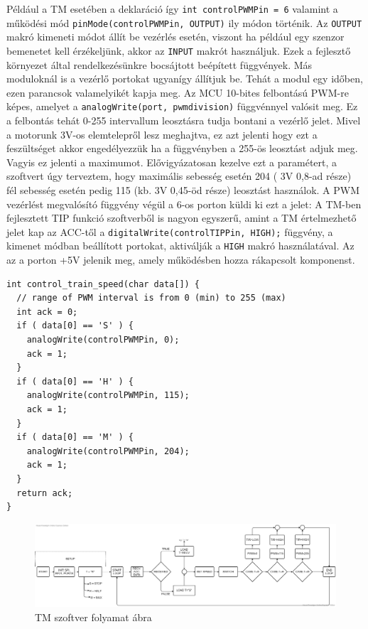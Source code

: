 \documentclass[a4paper,12pt]{article}
\begin{document}
Például a TM esetében a deklaráció így \texttt{int controlPWMPin = 6} valamint a működési mód \texttt{pinMode(controlPWMPin, OUTPUT)} ily módon történik.
Az \texttt{OUTPUT} makró kimeneti módot állít be vezérlés esetén, viszont ha például egy szenzor bemenetet kell érzékeljünk, akkor az \texttt{INPUT} makrót használjuk. 
Ezek a fejlesztő környezet által rendelkezésünkre bocsájtott beépített függvények. Más moduloknál is a vezérlő portokat ugyanígy állítjuk be.
Tehát a modul egy időben, ezen parancsok valamelyikét kapja meg.
Az MCU 10-bites felbontású PWM-re képes, amelyet a \texttt{analogWrite(port, pwmdivision)} függvénnyel valósit meg.
Ez a felbontás tehát 0-255 intervallum leosztásra tudja bontani a vezérlő jelet.
Mivel a motorunk 3V-os elemtelepről lesz meghajtva, ez azt jelenti hogy ezt a feszültséget akkor engedélyezzük ha a függvényben a 255-ös leosztást adjuk meg.
Vagyis ez jelenti a maximumot. 
Elővigyázatosan kezelve ezt a paramétert, a szoftvert úgy terveztem, hogy maximális sebesség esetén 204 ( 3V 0,8-ad része) fél sebesség esetén pedig 115 (kb. 3V 0,45-öd része) leosztást használok.
A PWM vezérlést megvalósító függvény végül a 6-os porton küldi ki ezt a jelet:
A TM-ben fejlesztett TIP funkció szoftverből is nagyon egyszerű, amint a TM értelmezhető jelet kap az ACC-től a \texttt{digitalWrite(controlTIPPin, HIGH);} függvény, a kimenet módban beállított portokat, aktiválják a \texttt{HIGH} makró használatával. Az az a porton +5V jelenik meg, amely működésben hozza rákapcsolt komponenst. 

\begin{minipage}{\linewidth}
\begin{lstlisting}[style=CStyle, caption={DC motor PWM vezérlése TM-ben},label=code:tm_pwm]
int control_train_speed(char data[]) {
  // range of PWM interval is from 0 (min) to 255 (max)
  int ack = 0;
  if ( data[0] == 'S' ) {
    analogWrite(controlPWMPin, 0);
    ack = 1;
  }
  if ( data[0] == 'H' ) {
    analogWrite(controlPWMPin, 115);
    ack = 1;
  }
  if ( data[0] == 'M' ) {
    analogWrite(controlPWMPin, 204);
    ack = 1;
  }
  return ack;
}
\end{lstlisting}
\end{minipage}

\begin{figure}[!htp]
	\includegraphics[width=\linewidth]{images/TM_module_flow_chart.png}
    \caption[TM folyamat ábra]{TM szoftver folyamat ábra}
	\label{fig:TMflowchart}
\end{figure}
\end{document}
